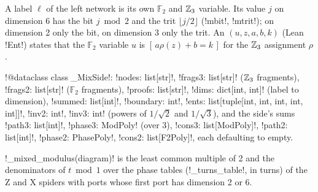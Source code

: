 {{{A label $\ell$ of the left network is its own $\mathbb{F}_2$ and $\mathbb{Z}_3$ variable. Its value
$j$ on dimension 6 has the bit $j \bmod 2$ and the trit $\lfloor j/2\rfloor$ (\lexlean!mbit!,
\lexlean!mtrit!); on dimension 2 only the bit, on dimension 3 only the trit. An  $(u, z, a, b, k)$ (Lean \lexlean!Ent!) states that the $\mathbb{F}_2$ variable $u$ is
$[\,a\rho(z)+b = k\,]$ for the $\mathbb{Z}_3$ assignment $\rho$.

\begin{signature}
\lexpy!@dataclass class _MixSide!: \lexpy!nodes: list[str]!, \lexpy!frags3: list[str]! ($\mathbb{Z}_3$
fragments), \lexpy!frags2: list[str]! ($\mathbb{F}_2$ fragments), \lexpy!proofs: list[str]!,
\lexpy!dims: dict[int, int]! (label to dimension), \lexpy!summed: list[int]!, \lexpy!boundary: int!,
\lexpy!ents: list[tuple[int, int, int, int, int]]!, \lexpy!inv2: int!, \lexpy!inv3: int! (powers of
$1/\sqrt2$ and $1/\sqrt3$), and the side's sums \lexpy!path3: list[int]!, \lexpy!phase3: ModPoly!
(over 3), \lexpy!cons3: list[ModPoly]!, \lexpy!path2: list[int]!, \lexpy!phase2: PhasePoly!,
\lexpy!cons2: list[F2Poly]!, each defaulting to empty.
\end{signature}

\lexpy!_mixed_modulus(diagram)! is the least common multiple of 2 and the denominators of
$t \bmod 1$ over the phase tables (\lexpy!_turns_table!, in turns) of the Z and X spiders with
ports whose first port has dimension 2 or 6.

}}}
